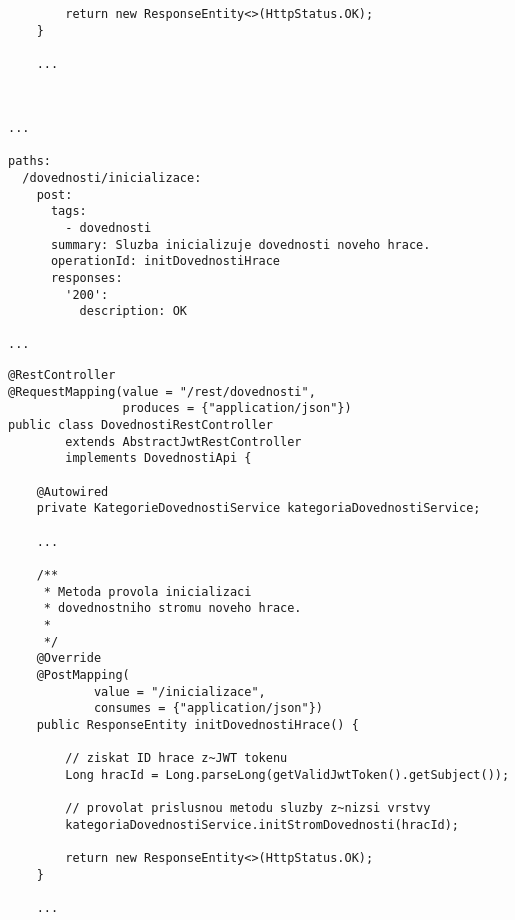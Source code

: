 \documentclass[12pt]{article}
\begin{document}
{\begin{lstlisting}
        return new ResponseEntity<>(HttpStatus.OK);
    }
    
    ...
    
\end{lstlisting}



\begin{lstlisting}

...

paths:
  /dovednosti/inicializace:
    post:
      tags:
        - dovednosti
      summary: Sluzba inicializuje dovednosti noveho hrace.
      operationId: initDovednostiHrace
      responses:
        '200':
          description: OK

...

\end{lstlisting}


\begin{lstlisting}
@RestController
@RequestMapping(value = "/rest/dovednosti",
                produces = {"application/json"})
public class DovednostiRestController 
        extends AbstractJwtRestController 
        implements DovednostiApi {

    @Autowired
    private KategorieDovednostiService kategoriaDovednostiService;
    
    ...

    /**
     * Metoda provola inicializaci
     * dovednostniho stromu noveho hrace.
     * 
     */
    @Override
    @PostMapping(
            value = "/inicializace",
            consumes = {"application/json"})
    public ResponseEntity initDovednostiHrace() {
        
        // ziskat ID hrace z~JWT tokenu
        Long hracId = Long.parseLong(getValidJwtToken().getSubject());

        // provolat prislusnou metodu sluzby z~nizsi vrstvy
        kategoriaDovednostiService.initStromDovednosti(hracId);
        
        return new ResponseEntity<>(HttpStatus.OK);
    }
    
    ...
    
\end{lstlisting}




\begin{lstlisting}


\end{lstlisting}}
\end{document}
